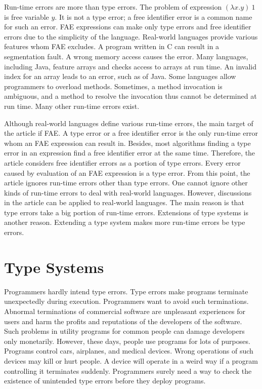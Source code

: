 Run-time errors are more than type errors. The problem of expression $(\lambda
x.y)\ 1$ is free variable $y$. It is not a type error; a free identifier error is
a common name for such an error. FAE expressions can make only type errors and
free identifier errors due to the simplicity of the language. Real-world
languages provide various features whom FAE excludes. A program written in C can
result in a segmentation fault. A wrong memory access causes the error. Many
languages, including Java, feature arrays and checks access to arrays at run
time. An invalid index for an array leads to an error, such as
 of Java. Some languages allow programmers
to overload methods. Sometimes, a method invocation is ambiguous, and a method to
resolve the invocation thus cannot be determined at run time. Many other run-time
errors exist.

Although real-world languages define various run-time errors, the main target of
the article if FAE. A type error or a free identifier error is the only run-time
error whom an FAE expression can result in. Besides, most algorithms finding a
type error in an expression find a free identifier error at the same time.
Therefore, the article considers free identifier errors as a portion of type
errors. Every error caused by evaluation of an FAE expression is a type error.
From this point, the article ignores run-time errors other than type errors. One
cannot ignore other kinds of run-time errors to deal with real-world languages.
However, discussions in the article can be applied to real-world languages. The
main reason is that type errors take a big portion of run-time errors.
Extensions of type systems is another reason. Extending a type system makes more
run-time errors be type errors.

\section{Type Systems}

Programmers hardly intend type errors. Type errors make programs terminate
unexpectedly during execution. Programmers want to avoid such terminations.
Abnormal terminations of commercial software are unpleasant experiences for users
and harm the profits and reputations of the developers of the software. Such
problems in utility programs for common people can damage developers only
monetarily. However, these days, people use programs for lots of purposes.
Programs control cars, airplanes, and medical devices. Wrong operations of such
devices may kill or hurt people. A device will operate in a weird way if a
program controlling it terminates suddenly. Programmers surely need a way to
check the existence of unintended type errors before they deploy programs.

